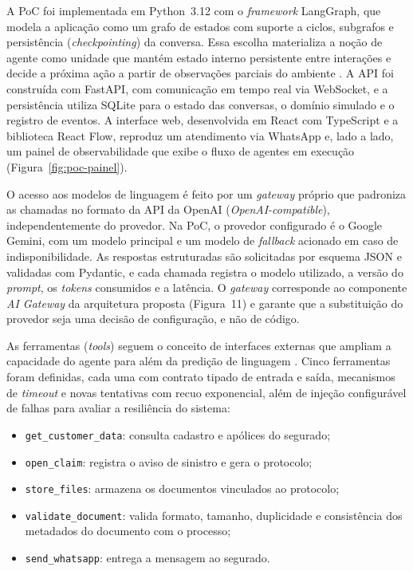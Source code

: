 A PoC foi implementada em Python~3.12 com o \textit{framework} LangGraph, que modela a
aplicação como um grafo de estados com suporte a ciclos, subgrafos e persistência
(\textit{checkpointing}) da conversa. Essa escolha materializa a noção de agente como unidade
que mantém estado interno persistente entre interações e decide a próxima ação a partir de
observações parciais do ambiente \cite{liu2024,wang2023}. A API foi construída com FastAPI, com
comunicação em tempo real via WebSocket, e a persistência utiliza SQLite para o estado das
conversas, o domínio simulado e o registro de eventos. A interface web, desenvolvida em React
com TypeScript e a biblioteca React Flow, reproduz um atendimento via WhatsApp e, lado a
lado, um painel de observabilidade que exibe o fluxo de agentes em execução
(Figura~\ref{fig:poc-painel}).

O acesso aos modelos de linguagem é feito por um \textit{gateway} próprio que padroniza as
chamadas no formato da API da OpenAI (\textit{OpenAI-compatible}), independentemente do
provedor. Na PoC, o provedor configurado é o Google Gemini, com um modelo principal e um
modelo de \textit{fallback} acionado em caso de indisponibilidade. As respostas estruturadas
são solicitadas por esquema JSON e validadas com Pydantic, e cada chamada registra o modelo
utilizado, a versão do \textit{prompt}, os \textit{tokens} consumidos e a latência. O
\textit{gateway} corresponde ao componente \textit{AI Gateway} da arquitetura proposta
(Figura~11) e garante que a substituição do provedor seja uma decisão de configuração, e não de
código.

As ferramentas (\textit{tools}) seguem o conceito de interfaces externas que ampliam a
capacidade do agente para além da predição de linguagem \cite{schick2023,qin2023}. Cinco
ferramentas foram definidas, cada uma com contrato tipado de entrada e saída, mecanismos de
\textit{timeout} e novas tentativas com recuo exponencial, além de injeção configurável de
falhas para avaliar a resiliência do sistema:

\begin{itemize}
  \item \texttt{get\_customer\_data}: consulta cadastro e apólices do segurado;
  \item \texttt{open\_claim}: registra o aviso de sinistro e gera o protocolo;
  \item \texttt{store\_files}: armazena os documentos vinculados ao protocolo;
  \item \texttt{validate\_document}: valida formato, tamanho, duplicidade e consistência dos
        metadados do documento com o processo;
  \item \texttt{send\_whatsapp}: entrega a mensagem ao segurado.
\end{itemize}


